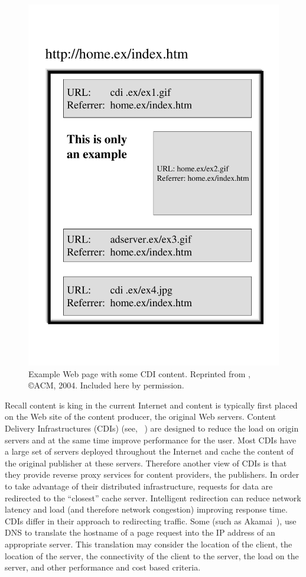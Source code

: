 \begin{figure} 
\begin{center}
\includegraphics[width=0.6\linewidth]{figures-pdf/page}
\vspace*{-.7cm}
\end{center}
\caption{Example Web page with some CDI content. Reprinted from \cite{inferring-web-demand}, \copyright ACM, 2004. Included here by permission.}
\label{fig:aka:cdn_page}
\end{figure}

Recall content is king in the current Internet and content is typically first
placed on the Web site of the content producer, the original Web servers.
Content Delivery Infrastructures (CDIs) (see,
\eg~\cite{cdn:2002,akamai:2002,gadde01web,bent02whole,johnson00measured,bala:imw01,gribble:osdi02})
are designed to reduce the load on origin servers and at the same time improve
performance for the user.  Most CDIs have a large set of servers deployed
throughout the Internet and cache the content of the original publisher at
these servers.  Therefore another view of CDIs is that they provide reverse
proxy services for content providers, the publishers.  In order to take
advantage of their distributed infrastructure, requests for data are redirected
to the ``closest'' cache server. Intelligent redirection can reduce network
latency and load (and therefore network congestion) improving response time.
CDIs differ in their approach to redirecting traffic. Some (such as
Akamai~\cite{Akamai-Network}), use DNS to translate the hostname of a page
request into the IP address of an appropriate server. This translation may
consider the location of the client, the location of the server, the
connectivity of the client to the server, the load on the server, and other
performance and cost based criteria.


